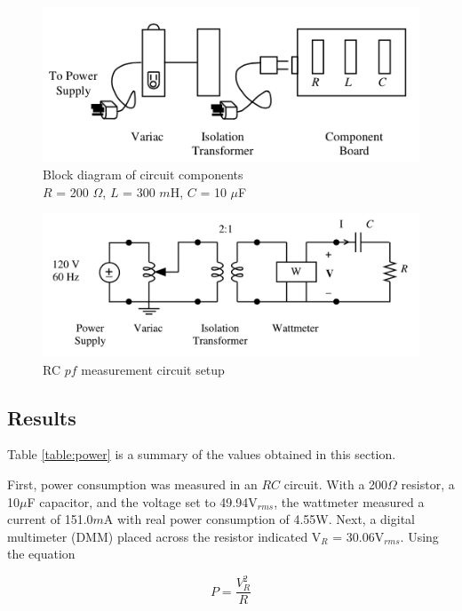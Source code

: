 \documentclass[12pt]{article}
\begin{document}
\begin{figure}[h]
	\centering
	\includegraphics[scale=0.75]{power_components}
	\caption{Block diagram of circuit components\\$R$ = 200 $\Omega$, $L$ = 300 $m$H, $C$ = 10 $\mu$F}
	\label{fig:comp_diagram}
\end{figure}

\begin{figure}[h]
	\centering
	\includegraphics[scale=0.75]{pf_circuit}
	\caption{RC $pf$ measurement circuit setup}
	\label{fig:pf_circuit}
\end{figure}

\subsection{Results}\label{sec:pow_results}

Table \ref{table:power} is a summary of the values obtained in this section.

First, power consumption was measured in an $RC$ circuit. With a 200$\Omega$ resistor, a 10$\mu$F capacitor, and the voltage set to 49.94V$_{rms}$, the wattmeter measured a current of 151.0$m$A with real power consumption of 4.55W. Next, a digital multimeter (DMM) placed across the resistor indicated V$_R$ = 30.06V$_{rms}$. Using the equation

\begin{equation}
	P = \frac{V_{R}^2}{R} 
	\label{eqn:P}
\end{equation}
\end{document}
